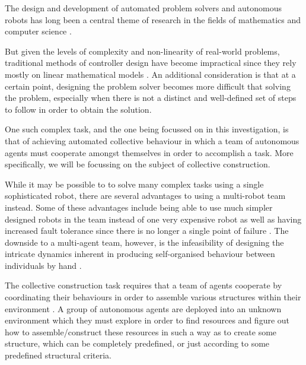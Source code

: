 
The design and development of automated problem solvers and autonomous robots has long been a central theme of research in the fields of mathematics and computer science \cite{RefWorks:33}.

But given the levels of complexity and non-linearity of real-world problems, traditional methods of controller design have become impractical since they rely mostly on linear mathematical models \cite{RefWorks:32}. An additional consideration is that at a certain point, designing the problem solver becomes more difficult that solving the problem, especially when there is not a distinct and well-defined set of steps to follow in order to obtain the solution.

One such complex task, and the one being focussed on in this investigation, is that of achieving automated collective behaviour in which a team of autonomous agents must cooperate amongst themselves in order to accomplish a task. More specifically, we will be focussing on the subject of collective construction.

While it may be possible to to solve many complex tasks using a single sophisticated robot, there are several advantages to using a multi-robot team instead. Some of these advantages include being able to use much simpler designed robots in the team instead of one very expensive robot as well as having increased fault tolerance since there is no longer a single point of failure \cite{chaimowicz2001architecture}. The downside to a multi-agent team, however, is the infeasibility of designing the intricate dynamics inherent in producing self-organised behaviour between individuals by hand \cite{RefWorks:11}.

The collective construction task requires that a team of agents cooperate by coordinating their behaviours in order to assemble various structures within their environment \cite{NitschkeSaEC2012}. A group of autonomous agents are deployed into an unknown environment which they must explore in order to find resources and figure out how to assemble/construct these resources in such a way as to create some structure, which can be completely predefined, or just according to some predefined structural criteria.

